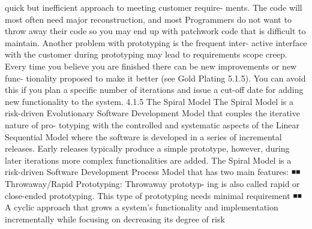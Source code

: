 \documentclass[a4paper,12pt]{book}
\begin{document}
quick but inefficient approach to meeting customer require-
ments. The code will most often need major reconstruction,
and most Programmers do not want to throw away their
code so you may end up with patchwork code that is difficult
to maintain.
Another problem with prototyping is the frequent inter-
active interface with the customer during prototyping may
lead to requirements scope creep. Every time you believe you
are finished there can be new improvements or new func-
tionality proposed to make it better (see Gold Plating 5.1.5).
You can avoid this if you plan a specific number of iterations
and issue a cut-off date for adding new functionality to the
system.
4.1.5 The Spiral Model
The Spiral Model is a risk-driven Evolutionary Software
Development Model that couples the iterative nature of pro-
totyping with the controlled and systematic aspects of the
Linear Sequential Model where the software is developed
in a series of incremental releases. Early releases typically
produce a simple prototype, however, during later iterations
more complex functionalities are added. The Spiral Model
is a risk-driven Software Development Process Model that has
two main features:
◾◾ Throwaway/Rapid Prototyping: Throwaway prototyp-
ing is also called rapid or close-ended prototyping.
This type of prototyping needs minimal requirement
◾◾ A cyclic approach that grows a system’s functionality
and implementation incrementally while focusing on
decreasing its degree of risk
\end{document}
